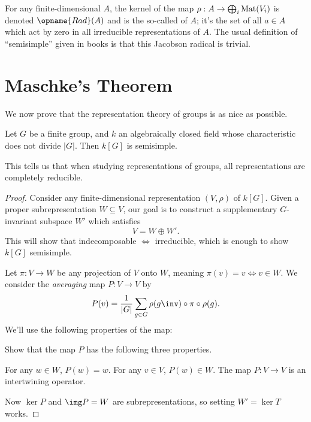 \documentclass[11pt]{scrreprt}
\begin{document}
\begin{remark}
	[Digression]
	For any finite-dimensional $A$, the kernel of the map
	$\rho : A \to \bigoplus_i \mathrm{Mat}(V_i)$ is denoted $\opname{Rad}(A)$
	and is the so-called  of $A$;
	it's the set of all $a \in A$ which act by zero in all irreducible representations of $A$.
	The usual definition of ``semisimple'' given in books is that
	this Jacobson radical is trivial.
\end{remark}

\section{Maschke's Theorem}
We now prove that the representation theory of groups is as nice as possible.
\begin{theorem}
	Let $G$ be a finite group, and $k$ an algebraically closed
	field whose characteristic does not divide $|G|$.
	Then $k[G]$ is semisimple.
\end{theorem}
This tells us that when studying representations of groups,
all representations are completely reducible.
\begin{proof}
	Consider any finite-dimensional representation $(V, \rho)$ of $k[G]$.
	Given a proper subrepresentation $W \subseteq V$,
	our goal is to construct a supplementary $G$-invariant subspace $W'$
	which satisfies \[ V = W \oplus W'. \]
	This will show that indecomposable $\iff$ irreducible,
	which is enough to show $k[G]$ semisimple.

	Let $\pi : V \to W$ be any projection of $V$ onto $W$,
	meaning $\pi(v) = v \iff v \in W$.
	We consider the \emph{averaging} map $P : V \to V$ by
	\[ 
		P(v) = \frac{1}{\left\lvert G \right\rvert}
		\sum_{g \in G} \rho(g\inv) \circ \pi \circ \rho(g).
	\]
	We'll use the following properties of the map:
	\begin{exercise}
		Show that the map $P$ has the following three properties.
		\begin{itemize}
			\ii For any $w \in W$, $P(w) = w$.
			\ii For any $v \in V$, $P(w) \in W$.
			\ii The map $P : V \to V$ is an intertwining operator.
		\end{itemize}
	\end{exercise}
	Now $\ker P$ and $\img P = W$ are subrepresentations,
	so setting $W' = \ker T$ works.
\end{proof}
\end{document}
